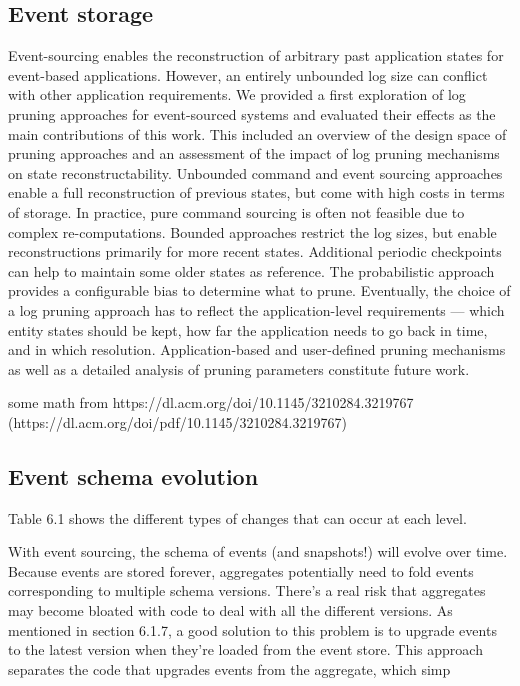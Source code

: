 \subsection{Event storage}

Event-sourcing enables the reconstruction of arbitrary past application states for event-based applications. However, an entirely
unbounded log size can conflict with other application requirements. We provided a first exploration of log pruning approaches
for event-sourced systems and evaluated their effects as the main
contributions of this work. This included an overview of the design
space of pruning approaches and an assessment of the impact of
log pruning mechanisms on state reconstructability.
Unbounded command and event sourcing approaches enable
a full reconstruction of previous states, but come with high costs
in terms of storage. In practice, pure command sourcing is often
not feasible due to complex re-computations. Bounded approaches
restrict the log sizes, but enable reconstructions primarily for more
recent states. Additional periodic checkpoints can help to maintain
some older states as reference. The probabilistic approach provides
a configurable bias to determine what to prune. Eventually, the
choice of a log pruning approach has to reflect the application-level
requirements — which entity states should be kept, how far the
application needs to go back in time, and in which resolution.
Application-based and user-defined pruning mechanisms as well
as a detailed analysis of pruning parameters constitute future work.

some math from https://dl.acm.org/doi/10.1145/3210284.3219767 (https://dl.acm.org/doi/pdf/10.1145/3210284.3219767)

\subsection{Event schema evolution}

Table 6.1 shows the different types of changes that can occur at each level.~\citep{richardson2018microservices}

With event sourcing, the schema of events (and snapshots!) will evolve over time.
Because events are stored forever, aggregates potentially need to fold events corresponding to multiple schema versions. There’s a real risk that aggregates may become
bloated with code to deal with all the different versions. As mentioned in section 6.1.7,
a good solution to this problem is to upgrade events to the latest version when they’re
loaded from the event store. This approach separates the code that upgrades events
from the aggregate, which simp

